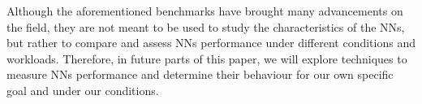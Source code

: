 Although the aforementioned benchmarks have brought many advancements on the field, they are not meant to be used to study the characteristics of the NNs, but rather to compare and assess NNs performance under different conditions and workloads. Therefore, in future parts of this paper, we will explore techniques to measure NNs performance and determine their behaviour for our own specific goal and under our conditions.  










